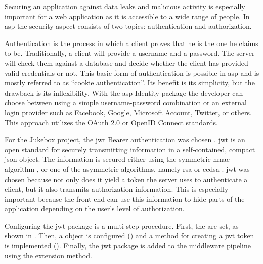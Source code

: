 Securing an application against data leaks and malicious activity is especially important for a web application as it is accessible to a wide range of people. In \gls{asp} the security aspect consists of two topics: authentication and authorization.


Authentication is the process in which a client proves that he is the one he claims to be. Traditionally, a client will provide a username and a password. The server will check them against a database and decide whether the client has provided valid credentials or not. This basic form of authentication is possible in \gls{asp} and is mostly referred to as \enquote{cookie authentication}. Its benefit is its simplicity, but the drawback is its inflexibility. With the \gls{asp} Identity package the developer can choose between using a simple username-password combination or an external login provider such as Facebook, Google, Microsoft Account, Twitter, or others. This approach utilizes the OAuth 2.0 \cite{oauth2} or OpenID Connect \cite{openID} standards. \cite{identityStorageProviders}



For the Jukebox project, the \gls{jwt} Bearer authentication was chosen \cite{jwt}. \gls{jwt} is an open standard for securely transmitting information in a self-contained, compact \gls{json} object. The information is secured either using the symmetric \gls{hmac} algorithm \cite{hmac}, or one of the asymmetric algorithms, namely \gls{rsa} or \gls{ecdsa} \cite{ecdsa}. \gls{jwt} was chosen because not only does it yield a token the server uses to authenticate a client, but it also transmits authorization information. This is especially important because the front-end can use this information to hide parts of the application depending on the user's level of authorization.

Configuring the \gls{jwt} package is a multi-step procedure. First, the  are set, as shown in . Then, a  object is configured () and a method for creating a \gls{jwt} token is implemented (). Finally, the \gls{jwt} package is added to the middleware pipeline using the  extension method.


